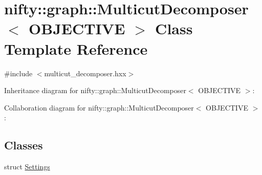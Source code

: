 \hypertarget{classnifty_1_1graph_1_1MulticutDecomposer}{}\section{nifty\+:\+:graph\+:\+:Multicut\+Decomposer$<$ O\+B\+J\+E\+C\+T\+I\+V\+E $>$ Class Template Reference}
\label{classnifty_1_1graph_1_1MulticutDecomposer}


{\ttfamily \#include $<$multicut\+\_\+decomposer.\+hxx$>$}



Inheritance diagram for nifty\+:\+:graph\+:\+:Multicut\+Decomposer$<$ O\+B\+J\+E\+C\+T\+I\+V\+E $>$\+:


Collaboration diagram for nifty\+:\+:graph\+:\+:Multicut\+Decomposer$<$ O\+B\+J\+E\+C\+T\+I\+V\+E $>$\+:
\subsection*{Classes}
\begin{DoxyCompactItemize}
\item 
struct \hyperlink{structnifty_1_1graph_1_1MulticutDecomposer_1_1Settings}{Settings}
\end{DoxyCompactItemize}

